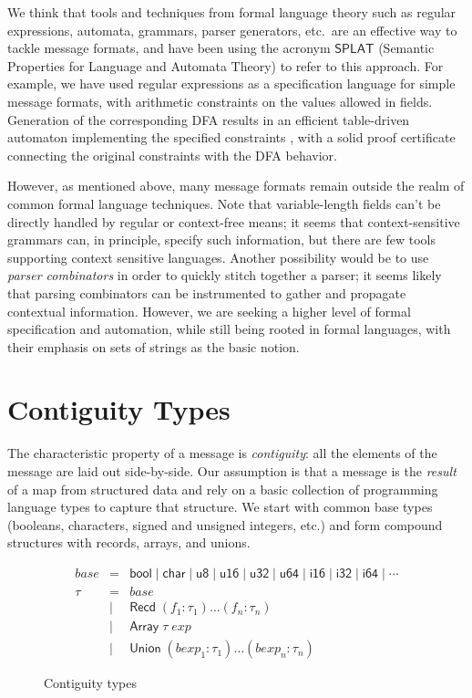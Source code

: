 \documentclass[svgnames]{llncs}
\newcommand{\etc}{etc.}
\newcommand{\konst}[1]{\ensuremath{\mathsf{#1}}}
\begin{document}
We think that tools and techniques from formal language theory such as
regular expressions, automata, grammars, parser generators, \etc\, are
an effective way to tackle message formats, and have been using the
acronym \konst{SPLAT} (Semantic Properties for Language and Automata
Theory) to refer to this approach. For example, we have used regular
expressions as a specification language for simple message formats,
with arithmetic constraints on the values allowed in
fields. Generation of the corresponding DFA results in an efficient
table-driven automaton implementing the specified constraints \cite{},
with a solid proof certificate connecting the original constraints
with the DFA behavior.

However, as mentioned above, many message formats remain outside the
realm of common formal language techniques.  Note that variable-length
fields can't be directly handled by regular or context-free means; it
seems that context-sensitive grammars can, in principle, specify such
information, but there are few tools supporting context sensitive
languages. Another possibility would be to use \emph{parser
  combinators} in order to quickly stitch together a parser; it seems
likely that parsing combinators can be instrumented to gather and
propagate contextual information. However, we are seeking a higher
level of formal specification and automation, while still being rooted
in formal languages, with their emphasis on sets of strings as the
basic notion.

\section {Contiguity Types}

The characteristic property of a message is \emph{contiguity}: all the
elements of the message are laid out side-by-side. Our assumption is
that a message is the \emph{result} of a map from structured data and
rely on a basic collection of programming language types to capture
that structure. We start with common base types (booleans, characters,
signed and unsigned integers, \etc) and form compound structures with
records, arrays, and unions.

\begin{figure}
\[
\begin{array}{rcl}
 \mathit{base} & = & \konst{bool} \mid \konst{char} \mid \konst{u8} \mid
 \konst{u16} \mid \konst{u32} \mid \konst{u64}  \mid \konst{i16} \mid
 \konst{i32} \mid \konst{i64} \mid \cdots \\
 \tau & = & \mathit{base} \\
      & \mid & \konst{Recd}\; (f_1 : \tau_1) \ldots (f_n : \tau_n) \\
      & \mid & \konst{Array}\; \tau \; \mathit{exp} \\
      & \mid & \konst{Union}\; (\mathit{bexp}_1 : \tau_1) \ldots (\mathit{bexp}_n : \tau_n)
\end{array}
\]
\label{contig-types}
\caption{Contiguity types}
\end{figure}
\end{document}
